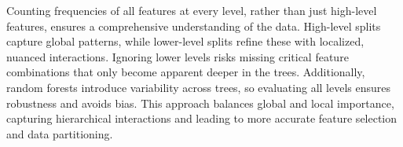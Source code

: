 \documentclass[fleqn,moreauthors,10pt]{ds_report}
\begin{document}
Counting frequencies of all features at every level, rather than just high-level features, ensures a comprehensive understanding of the data. High-level splits capture global patterns, while lower-level splits refine these with localized, nuanced interactions. Ignoring lower levels risks missing critical feature combinations that only become apparent deeper in the trees. Additionally, random forests introduce variability across trees, so evaluating all levels ensures robustness and avoids bias. This approach balances global and local importance, capturing hierarchical interactions and leading to more accurate feature selection and data partitioning.














\end{document}
